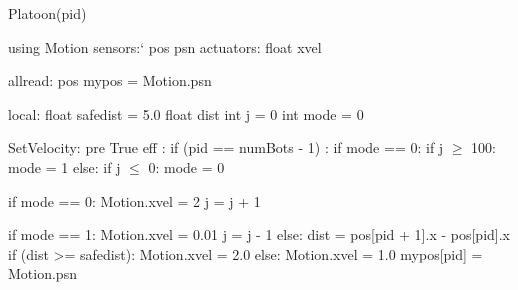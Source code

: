 Platoon(pid)

using Motion 
    sensors:`
       pos psn
    actuators:
       float xvel
       
allread:
   pos mypos = Motion.psn

local:
   float safedist = 5.0
   float dist 
   int j = 0 
   int mode = 0
   
SetVelocity:
  pre True
  eff :
     if (pid == numBots - 1) :
        if mode == 0:
            if j $\geq$ 100:
                 mode = 1
        else:
            if j $\leq$ 0:
                mode = 0
                
        if mode == 0:
            Motion.xvel = 2
            j = j + 1
          
        if mode == 1:
            Motion.xvel = 0.01
            j = j - 1
     else:
        dist = pos[pid + 1].x - pos[pid].x
        if (dist >= safedist):
            Motion.xvel = 2.0
        else:
            Motion.xvel = 1.0
    mypos[pid] = Motion.psn


